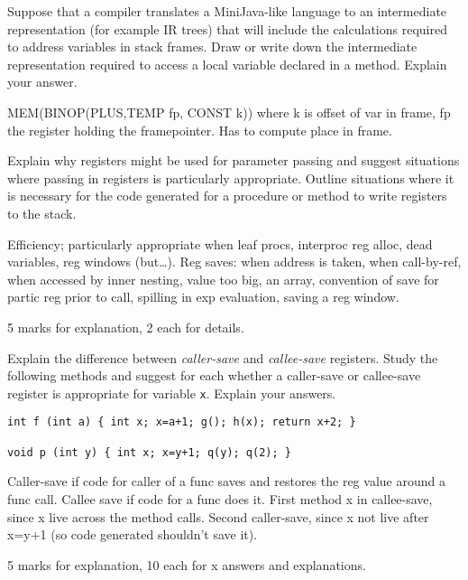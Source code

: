 \documentclass[11pt]{bareexam}
\begin{document}
\begin{questions}
\begin{subquestions}
\subquestion
Suppose  that a compiler translates a MiniJava-like language
to an intermediate representation (for example IR trees) 
that will include 
the calculations required to address variables in stack frames.
Draw or write down
the intermediate representation
required to access a local variable declared in a method.
Explain your answer.

\begin{modelanswer}
MEM(BINOP(PLUS,TEMP fp, CONST k)) where k is offset of var in frame, fp the
register holding the framepointer. Has to compute place in frame.
\end{modelanswer}

\subquestion
Explain why registers might be used for parameter passing and
suggest situations where passing in registers is particularly
appropriate. 
Outline situations where it is necessary for the code generated for a 
procedure or method to write registers to the stack.

\begin{modelanswer}
Efficiency; particularly appropriate when leaf procs, interproc
reg alloc, dead variables, reg windows (but\ldots).
Reg saves: when address is taken,
when call-by-ref,
when accessed by inner nesting,
value too big,
an array,
convention of save for partic reg prior to call,
spilling in exp evaluation,
saving a reg window.

5 marks for explanation, 2 each for details.
\end{modelanswer}

\subquestion
Explain the difference between \emph{caller-save\/} and \emph{callee-save\/}
registers. Study the following methods and suggest for each whether a caller-save 
or callee-save register is appropriate for variable \verb+x+. Explain your answers.
\begin{verbatim}
int f (int a) { int x; x=a+1; g(); h(x); return x+2; }

void p (int y) { int x; x=y+1; q(y); q(2); }
\end{verbatim}

\begin{modelanswer}
Caller-save if code for caller of a func saves and restores the reg value
around a func call. Callee save if code for a func does it. First method x in
callee-save, since x live across the method calls. Second caller-save, since
x not live after x=y+1 (so code generated shouldn't save it).

5 marks for explanation, 10 each for x answers and explanations.
\end{modelanswer}

\end{subquestions}

\end{questions}
\end{document}
